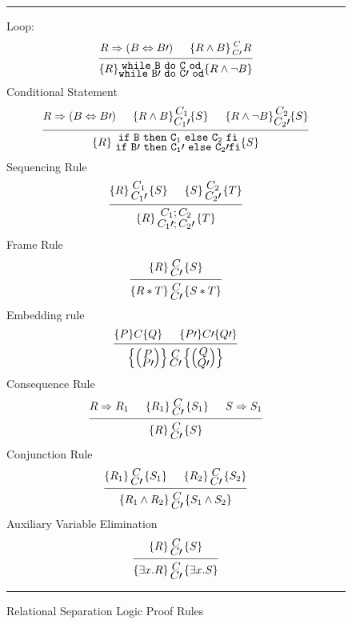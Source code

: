 \documentclass[12pt,a4paper]{article}
\newcommand{\hq}[4]{
	\left\{{#1}\right\}
	\let\scriptstyle\textstyle 
	\substack{{#2} \\ 	\let\scriptstyle\textstyle {#3}} 
	\left\{{#4}\right\}
}
\begin{document}
\begin{figure}
		\noindent\rule{\linewidth}{0.4pt}
	Loop:
	\[
	\begin{prooftree}
	\Hypo{R \Rightarrow (B \Leftrightarrow B\prime)}
	\Hypo{\{R \land B \} {C \atop C\prime} {R}}
	\Infer 2 {\{R\}
		\let\scriptstyle\textstyle 
		\substack{\mathtt{while\ B\ do\ C\ od} \\ \mathtt{while\ B\prime\ do\ C\prime\ od}} \{R \land \neg B\}}
	\end{prooftree}	
	\]
	Conditional Statement
	\[
	\begin{prooftree}
	\Hypo{R \Rightarrow (B \Leftrightarrow B\prime)}
	\Hypo{ \{R \land B\} 		
		\let\scriptstyle\textstyle 
		\substack{C_1 \\ C_1\prime} \{S\}
		}
	\Hypo{
		\{R \land \neg B\}
		\let\scriptstyle\textstyle 
		\substack{C_2 \\ C_2\prime}
		\{S\}
	}
	\Infer 3 {\{R\}\  	
				\let\scriptstyle\textstyle 
				\substack{\mathtt{if\ B\ then\ C_1\ else\ C_2\ fi} \\ \mathtt{if\ B\prime\ then\ C_1\prime\ else\ C_2\prime fi}} \{S\}}
	\end{prooftree}	
	\]
	Sequencing Rule
	\[
	\begin{prooftree}
	\Hypo{ \hq{R}{C_1}{C_1\prime}{S}}
	\Hypo{ \hq{S}{C_2}{C_2\prime}{T}}
	\Infer 2 {\hq{R}{C_1 ; C_2}{C_1\prime ; C_2\prime}{T}}
	\end{prooftree}	
	\]
	Frame Rule
	\[
	\begin{prooftree}
	\Hypo { \hq{R}{C}{C\prime}{S}}
	\Infer 1 {\hq{R * T} {C}{C\prime}{S * T}}
	\end{prooftree}	
	\]
	Embedding rule
	\[
	\begin{prooftree}
	\Hypo{\{P\} C \{Q\}}
	\Hypo{\{P\prime\} C\prime \{Q\prime\}}
	\Infer 2 {\hq{\left( \substack{P \\ P\prime}\right)}{C}{C\prime}{\left( \substack{Q \\ Q\prime}\right)}}
	\end{prooftree}	
	\]
	Consequence Rule
	\[
	\begin{prooftree}
	\Hypo{R \Rightarrow R_1}
	\Hypo{\hq{R_1}{C}{C\prime}{S_1}}
	\Hypo{S \Rightarrow S_1}
	\Infer 3 {\hq{R}{C}{C\prime}{S}}
	\end{prooftree}	
	\]
	Conjunction Rule
	\[
	\begin{prooftree}
	\Hypo{\hq{R_1}{C}{C\prime}{S_1}}
		\Hypo{\hq{R_2}{C}{C\prime}{S_2}}
	\Infer 2 {\hq{R_1 \land R_2}{C}{C\prime}{S_1 \land S_2}}
	\end{prooftree}	
	\]
	Auxiliary Variable Elimination
	\[
	\begin{prooftree}
	\Hypo{\hq{R}{C}{C\prime}{S}}
	\Infer 1 {\hq{\exists x.R}{C}{C\prime}{\exists x.S}}
	\end{prooftree}	
	\]
	\caption{Relational Separation Logic Proof Rules}
	\label{fig:ProofRue}
	\noindent\rule{\linewidth}{0.4pt}
\end{figure}
\end{document}
